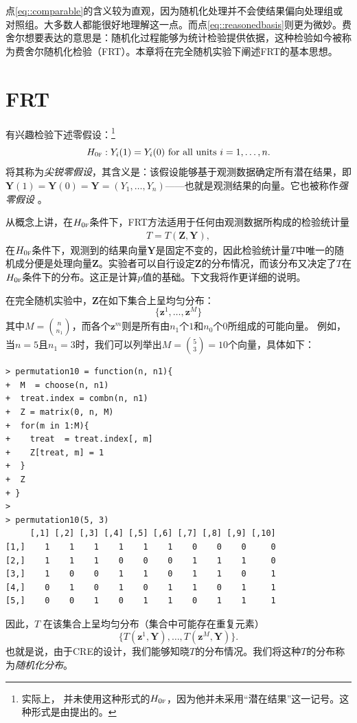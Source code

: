  
点\ref{eq::comparable}的含义较为直观，因为随机化处理并不会使结果偏向处理组或对照组。大多数人都能很好地理解这一点。而点\ref{eq::reasonedbasis}则更为微妙。费舍尔想要表达的意思是：随机化过程能够为统计检验提供依据，这种检验如今被称为费舍尔随机化检验（FRT）。本章将在完全随机实验下阐述FRT的基本思想。


\section{FRT}
\label{sec::frt-basics}

\citet{Fisher:1935} 有兴趣检验下述零假设：\footnote{ 实际上，\citet{Fisher:1935} 并未使用这种形式的$H_{0\textsc{f}}$，因为他并未采用“潜在结果”这一记号。这种形式是由\citet{Rubin:1980}提出的。}
$$
H_{0\textsc{f}}: Y_i(1) = Y_i(0) \text{ for all units } i=1,\ldots, n.
$$
\citet{Rubin:1980} 将其称为{\it 尖锐零假设}，其含义是：该假设能够基于观测数据确定所有潜在结果，即$\bm{Y}(1) = \bm{Y}(0) =  \bm{Y} = (Y_1, \ldots, Y_n)$——也就是观测结果的向量。它也被称作{\it 强零假设} \citep[e.g.,][]{wu2018randomization}。 


从概念上讲，在$H_{0\textsc{f}}$条件下，FRT方法适用于任何由观测数据所构成的检验统计量\begin{eqnarray}\label{eq::teststatistic}
T = T( \bm{Z}, \bm{Y})  ,
\end{eqnarray}在$H_{0\textsc{f}}$条件下，观测到的结果向量$\bm{Y}$是固定不变的，因此检验统计量$T$中唯一的随机成分便是处理向量$\bm{Z}$。实验者可以自行设定$\bm{Z}$的分布情况，而该分布又决定了$T$在$H_{0\textsc{f}}$条件下的分布。这正是计算$p$值的基础。下文我将作更详细的说明。 


在完全随机实验中，$\bm{Z}$在如下集合上呈均匀分布：
$$
\{  \bm{z}^1, \ldots, \bm{z}^M  \}
$$
其中$M = \binom{n}{n_1}$，而各个$ \bm{z}^m$则是所有由$n_1$个$1$和$n_0$个$0$所组成的可能向量。
例如，当$n=5$且$n_1=3$时，我们可以列举出$M = \binom{5}{3} = 10$个向量，具体如下：
\begin{lstlisting}
> permutation10 = function(n, n1){
+  M  = choose(n, n1)
+  treat.index = combn(n, n1)
+  Z = matrix(0, n, M)
+  for(m in 1:M){
+    treat  = treat.index[, m]
+    Z[treat, m] = 1
+  }
+  Z
+ }
> 
> permutation10(5, 3)
     [,1] [,2] [,3] [,4] [,5] [,6] [,7] [,8] [,9] [,10]
[1,]    1    1    1    1    1    1    0    0    0     0
[2,]    1    1    1    0    0    0    1    1    1     0
[3,]    1    0    0    1    1    0    1    1    0     1
[4,]    0    1    0    1    0    1    1    0    1     1
[5,]    0    0    1    0    1    1    0    1    1     1
\end{lstlisting}

因此，$T$ 在该集合上呈均匀分布（集合中可能存在重复元素）
$$
\{   T(\bm{z}^1,\bm{Y}) , \ldots, T( \bm{z}^M, \bm{Y})  \}.
$$
也就是说，由于CRE的设计，我们能够知晓$T$的分布情况。我们将这种$T$的分布称为{\it 随机化分布}。 




